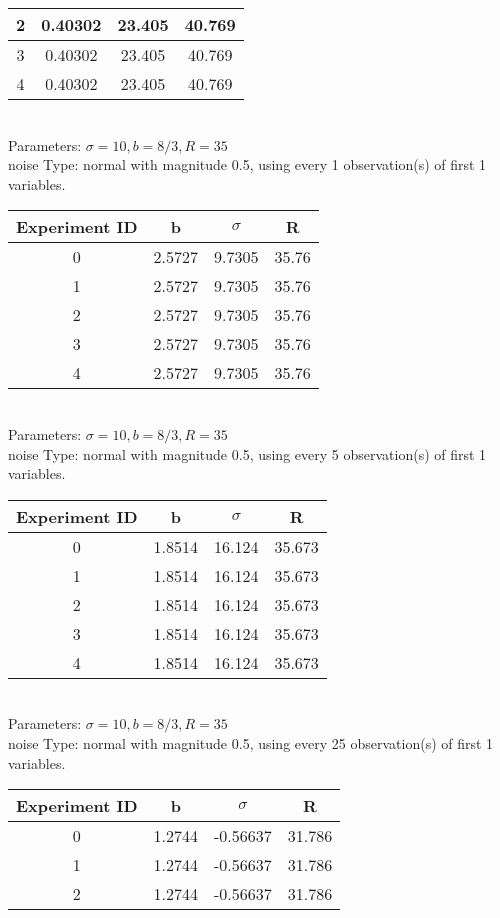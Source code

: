 \begin{multicols}{3}
\begin{tabular}{cccc}
 2 & 0.40302 & 23.405 & 40.769\\ \hline 
 3 & 0.40302 & 23.405 & 40.769\\ \hline 
 4 & 0.40302 & 23.405 & 40.769\\ \hline 
 \end{tabular}\\
Parameters: $\sigma=10, b=8/3, R=35$\\
noise Type: normal with magnitude 0.5, using every 1 observation(s) of first 1 variables.\\
\begin{tabular}{cccc}
\hline Experiment ID & b & $\sigma$ & R \\ \hline 
0 & 2.5727 & 9.7305 & 35.76\\ \hline 
 1 & 2.5727 & 9.7305 & 35.76\\ \hline 
 2 & 2.5727 & 9.7305 & 35.76\\ \hline 
 3 & 2.5727 & 9.7305 & 35.76\\ \hline 
 4 & 2.5727 & 9.7305 & 35.76\\ \hline 
 \end{tabular}\\
Parameters: $\sigma=10, b=8/3, R=35$\\
noise Type: normal with magnitude 0.5, using every 5 observation(s) of first 1 variables.\\
\begin{tabular}{cccc}
\hline Experiment ID & b & $\sigma$ & R \\ \hline 
0 & 1.8514 & 16.124 & 35.673\\ \hline 
 1 & 1.8514 & 16.124 & 35.673\\ \hline 
 2 & 1.8514 & 16.124 & 35.673\\ \hline 
 3 & 1.8514 & 16.124 & 35.673\\ \hline 
 4 & 1.8514 & 16.124 & 35.673\\ \hline 
 \end{tabular}\\
Parameters: $\sigma=10, b=8/3, R=35$\\
noise Type: normal with magnitude 0.5, using every 25 observation(s) of first 1 variables.\\
\begin{tabular}{cccc}
\hline Experiment ID & b & $\sigma$ & R \\ \hline 
0 & 1.2744 & -0.56637 & 31.786\\ \hline 
 1 & 1.2744 & -0.56637 & 31.786\\ \hline 
 2 & 1.2744 & -0.56637 & 31.786\\ \hline 

\end{tabular}
\end{multicols}
